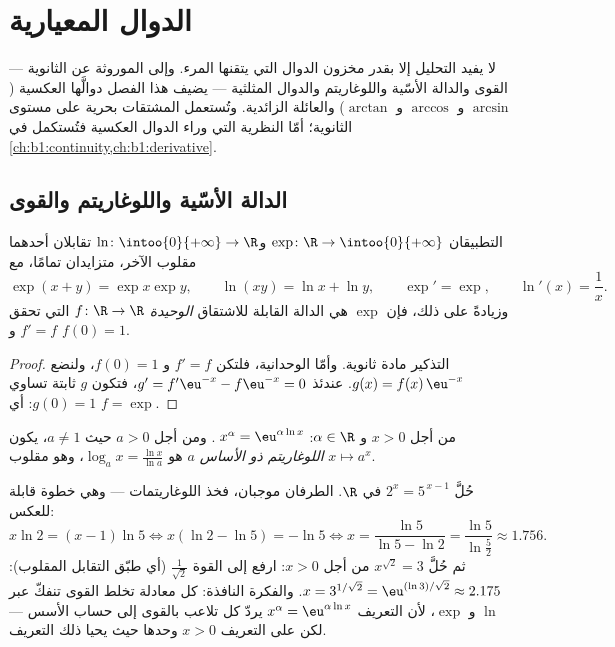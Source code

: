 \chapter{الدوال المعيارية}\label{ch:b1:functions}

لا يفيد التحليل إلا بقدر مخزون الدوال التي يتقنها المرء. وإلى
 الموروثة عن الثانوية --- القوى والدالة الأسّية
واللوغاريتم والدوال المثلثية --- يضيف هذا الفصل دوالَّها العكسية
($\arcsin$ و $\arccos$ و $\arctan$) والعائلة الزائدية.
وتُستعمل المشتقات بحرية على مستوى الثانوية؛ أمّا النظرية
التي وراء الدوال العكسية فتُستكمل في
\cref{ch:b1:continuity,ch:b1:derivative}.

\section{الدالة الأسّية واللوغاريتم والقوى}

\begin{proposition}\label{prop:b1:functions:expln}
التطبيقان $\exp \colon \R \to \intoo{0}{+\infty}$ و$\ln \colon
\intoo{0}{+\infty} \to \R$ تقابلان أحدهما مقلوب الآخر، متزايدان
تمامًا، مع
\[
\exp(x + y) = \exp x \exp y, \qquad \ln(xy) = \ln x + \ln y,
\qquad \exp' = \exp, \qquad \ln'(x) = \frac 1x .
\]
وزيادةً على ذلك، فإن $\exp$ هي الدالة القابلة للاشتقاق
\emph{الوحيدة} $f \colon
\R \to \R$ التي تحقق $f' = f$ و $f(0) = 1$.
\end{proposition}

\begin{proof}
التذكير مادة ثانوية. وأمّا الوحدانية، فلتكن $f' = f$ و
$f(0) = 1$، ولنضع $g(x) = f(x)\,\eu^{-x}$. عندئذ $g' = f'\eu^{-x} -
f\eu^{-x} = 0$، فتكون $g$ ثابتة تساوي $g(0) = 1$: أي $f = \exp$.
\end{proof}

\begin{definition}\label{def:b1:functions:powers}
من أجل $x > 0$ و $\alpha \in \R$:
$\;x^\alpha = \eu^{\alpha \ln x}$. ومن أجل $a > 0$
حيث $a \neq 1$، يكون \emph{اللوغاريتم ذو الأساس $a$} هو $\log_a x =
\frac{\ln x}{\ln a}$، وهو مقلوب $x \mapsto a^x$.
\end{definition}

\begin{example}\label{ex:b1:functions:expequations}
حُلَّ $2^x = 5^{\,x-1}$ في $\R$. الطرفان موجبان، فخذ
اللوغاريتمات --- وهي خطوة قابلة للعكس:
\[
x\ln2 = (x - 1)\ln5
\iff x(\ln2 - \ln5) = -\ln5
\iff x = \frac{\ln5}{\ln5 - \ln2} = \frac{\ln 5}{\ln\frac52}
\approx 1.756 .
\]
ثم حُلَّ $x^{\sqrt2} = 3$ من أجل $x > 0$: ارفع إلى القوة
$\frac1{\sqrt2}$ (أي طبّق التقابل المقلوب):
$x = 3^{1/\sqrt2} = \eu^{(\ln 3)/\sqrt2} \approx 2.175$. والفكرة
النافذة: كل معادلة تخلط القوى تنفكّ عبر $\ln$ و
$\exp$، لأن التعريف $x^\alpha = \eu^{\alpha\ln x}$
يردّ كل تلاعب بالقوى إلى حساب الأسس ---
لكن على  التعريف $x > 0$ وحدها حيث يحيا ذلك التعريف.
\end{example}

